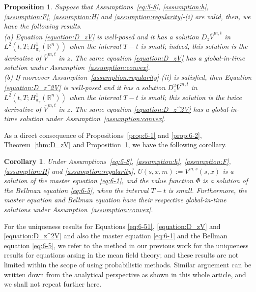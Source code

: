 \documentclass[11pt]{article}
\numberwithin{equation}{section}
\newtheorem{corollary}[theorem]{Corollary}
\newtheorem{proposition}[theorem]{Proposition}
\newcommand{\brn}{{\mathbb{R}^n}}
\newcommand{\1}{\mbox{1\hspace{-1mm}I}}
\begin{document}
\begin{proposition}\label{thm:D_zV'}
Suppose that Assumptions~\ref{eq:5-8}, \ref{assumption:h}, \ref{assumption:F}, \ref{assumption:H} and \ref{assumption:regularity}-(i) are valid, then, we have the following results. \\
(a) Equation \eqref{equation:D_zV} is well-posed and it has a solution $D_z\overline{V}^{m,t}$ in $L^{2}\left(t,T;H_{\pi_{\gamma}}^{1}(\brn)\right)$ when the interval $T-t$ is small; indeed, this solution is the derivative of $\overline{V}^{m,t}$ in $z$. The same equation \eqref{equation:D_zV} has a global-in-time solution under Assumption~\ref{assumption:convex}. \\
(b) If moreover Assumption~\ref{assumption:regularity}-(ii) is satisfied, then Equation \eqref{equation:D_z^2V} is well-posed and it has a solution $D_z^2\overline{V}^{m,t}$ in $L^{2}\left(t,T;H_{\pi_{\gamma}}^{1}(\brn)\right)$ when the interval $T-t$ is small; this solution is the twice derivative of $\overline{V}^{m,t}$ in $z$. The same equation \eqref{equation:D_z^2V} has a global-in-time solution under Assumption~\ref{assumption:convex}. 
\end{proposition}

As a direct consequence of Propositions~\ref{prop:6-1} and \ref{prop:6-2}, Theorem~\ref{thm:D_zV} and Proposition~\ref{thm:D_zV'}, we have the following corollary.

\begin{corollary}\label{corollary}
Under Assumptions~\ref{eq:5-8}, \ref{assumption:h}, \ref{assumption:F}, \ref{assumption:H} and \ref{assumption:regularity}, $U(s,x,m):=V^{m,s}(s,x)$ is a solution of the master equation \eqref{eq:6-1}, and the value function $\Phi$ is a solution of the Bellman equation \eqref{eq:6-5}, when the interval $T-t$ is small. Furthermore, the master equation and Bellman equation have their respective global-in-time solutions under Assumption~\ref{assumption:convex}.
\end{corollary} 

For the uniqueness results for Equations \eqref{eq:6-51}, \eqref{equation:D_zV} and \eqref{equation:D_z^2V} and also the master equation \eqref{eq:6-1} and the Bellman equation \eqref{eq:6-5}, we refer to the method in our previous work \cite{AB6,AB10,AB5} for the uniqueness results for equations arsing in the mean field theory; and these results are not limited within the scope of using probabilistic methods. Similar arguement can be written down from the analytical perspective as shown in this whole article, and we shall not repeat further here.
\end{document}
